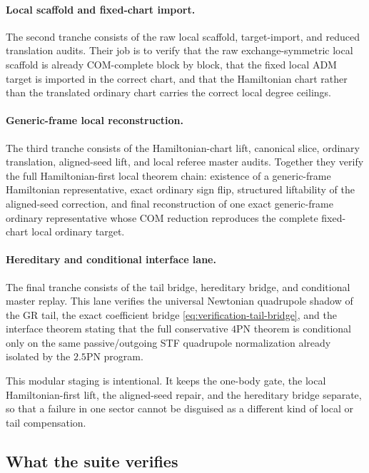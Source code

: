 \documentclass[11pt]{article}
\begin{document}
\paragraph{Local scaffold and fixed-chart import.}
The second tranche consists of the raw local scaffold, target-import, and
reduced translation audits.  Their job is to verify that the raw
exchange-symmetric local scaffold is already COM-complete block by block, that
the fixed local ADM target is imported in the correct chart, and that the
Hamiltonian chart rather than the translated ordinary chart carries the correct
local degree ceilings.

\paragraph{Generic-frame local reconstruction.}
The third tranche consists of the Hamiltonian-chart lift, canonical slice,
ordinary translation, aligned-seed lift, and local referee master audits.
Together they verify the full Hamiltonian-first local theorem chain: existence
of a generic-frame Hamiltonian representative, exact ordinary sign flip,
structured liftability of the aligned-seed correction, and final reconstruction
of one exact generic-frame ordinary representative whose COM reduction
reproduces the complete fixed-chart local ordinary target.

\paragraph{Hereditary and conditional interface lane.}
The final tranche consists of the tail bridge, hereditary bridge, and
conditional master replay.  This lane verifies the universal Newtonian
quadrupole shadow of the GR tail, the exact coefficient bridge
\eqref{eq:verification-tail-bridge}, and the interface theorem stating that the
full conservative $4$PN theorem is conditional only on the same
passive/outgoing STF quadrupole normalization already isolated by the $2.5$PN
program.

This modular staging is intentional.  It keeps the one-body gate, the local
Hamiltonian-first lift, the aligned-seed repair, and the hereditary bridge
separate, so that a failure in one sector cannot be disguised as a different
kind of local or tail compensation.

\subsection{What the suite verifies}
\label{sec:verification-verifies}
\end{document}
